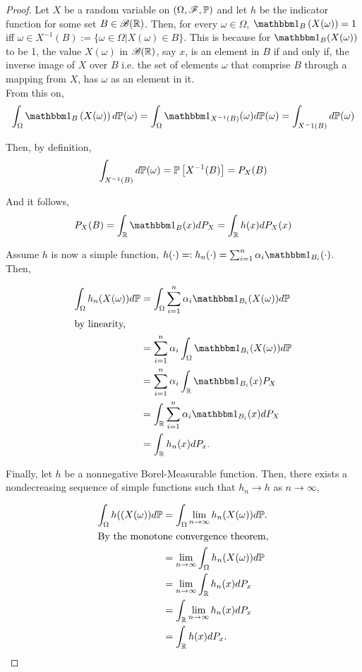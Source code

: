 \documentclass[../TGMAFFIRO.tex]{subfiles}
\begin{document}
\begin{proof}
Let $X$ be a random variable on $(\Omega, \mathscr{F}, \mathbb{P})$ and let $h$ be the indicator function for some set $B \in \mathscr{B}(\mathbb{R})$. Then, for every $\omega \in \Omega$, $\ind_B\left(X(\omega) \right) = 1$ iff $\omega \in X^{-1}(B) := \{\omega \in \Omega | X(\omega) \in B\}$. This is because for $\ind_B(X(\omega))$ to be 1, the value $X(\omega)$ in $\mathscr{B}(\mathbb{R})$, say $x$, is an element in $B$ if and only if, the inverse image of $X$ over $B$ i.e. the set of elements $\omega$ that comprise $B$ through a mapping from $X$, has $\omega$ as an element in it.\\

From this on,
\begin{equation*}
	\int_\Omega \ind_B\left(X(\omega)\right) d\Pm(\omega) = \int_\Omega \ind_{X^{-1}(B)} (\omega) d\Pm(\omega) = \int_{X{^-1}(B)} d\Pm(\omega)
\end{equation*}

Then, by definition,
\begin{equation}
	\int_{X^{-1}(B)} d\mathbb{P}(\omega) = \mathbb{P}\left[X^{-1}(B)\right] = P_X(B)
\end{equation}

And it follows,
\begin{equation*}
	P_X(B) = \int_\RNums \ind_{B}(x) dP_X = \int_\RNums h(x) dP_X(x)
\end{equation*}

Assume $h$ is now a simple function, $h(\cdot) =: h_n(\cdot) = \sum_{i=1}^n \alpha_i\ind_{B_i}(\cdot)$. Then,

\begin{align*}
	\int_\Omega h_n (X(\omega)) d\Pm &= \int_\Omega \sum_{i=1}^{n}\alpha_i \ind_{B_i}(X(\omega)) d\Pm\\
	\intertext{by linearity,}
	&= \sum_{i=1}^{n}\alpha_i\int_\Omega\ind_{B_i}(X(\omega)) d\Pm\\
	&= \sum_{i=1}^n\alpha_i\int_\RNums\ind_{B_i}(x) P_X\\
	&= \int_\RNums\sum_{i=1}^n\alpha_i\ind_{B_i}(x) dP_X\\
	&= \int_\RNums h_n(x) dP_x.
\end{align*}

Finally, let $h$ be a nonnegative Borel-Measurable function. Then, there exists a nondecreasing sequence of simple functions such that $h_n \to h$ as $n \to \infty$,

\begin{align*}
	\int_\Omega h((X(\omega)) d\mathbb{P} &= \int_\Omega \lim_{n\to\infty} h_n(X(\omega)) d\mathbb{P}. \\
	\intertext{By the monotone convergence theorem,}
	&= \lim_{n\to\infty} \int_\Omega h_n(X(\omega)) d\mathbb{P}\\
	&= \lim_{n\to\infty} \int_{\mathbb{R}} h_n(x) dP_x\\
	&= \int_{\mathbb{R}} \lim_{n\to\infty} h_n(x) dP_x\\
	&= \int_{\mathbb{R}} h(x) dP_x.
\end{align*}
\end{proof}
\end{document}
